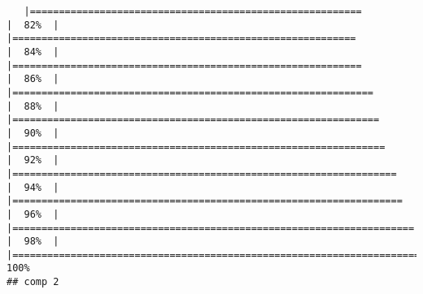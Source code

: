 \documentclass[
]{article}
\begin{document}
\begin{verbatim}
   |=========================================================             |  82%  |                                                                              |===========================================================           |  84%  |                                                                              |============================================================          |  86%  |                                                                              |==============================================================        |  88%  |                                                                              |===============================================================       |  90%  |                                                                              |================================================================      |  92%  |                                                                              |==================================================================    |  94%  |                                                                              |===================================================================   |  96%  |                                                                              |===================================================================== |  98%  |                                                                              |======================================================================| 100%
## comp 2 

\end{verbatim}
\end{document}
